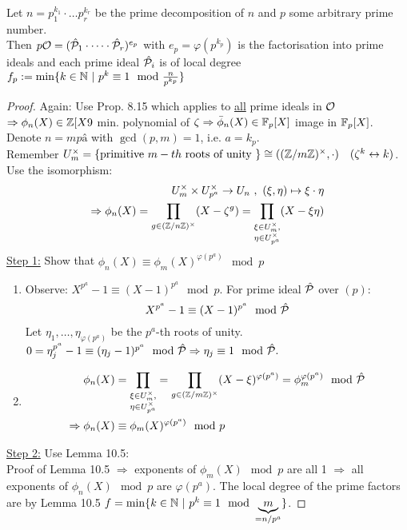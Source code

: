 \begin{Prop}
Let $n=p_1^{k_1} \cdot \ldots p_r^{k_r}$ be the prime decomposition of $n$ and $p$ some arbitrary prime number.\\
Then $p \mathcal{O}=(\hat{\mathcal{P}}_1 \cdot \dots \cdot \hat{\mathcal{P}}_r)^{e_p}$ with $e_p=\varphi(p^{k_p})$ is the factorisation into prime ideals and each prime ideal $\hat{\mathcal{P}}_i$ is of local degree $f_p:=\min\{k \in \mathbb{N} \ | \ p^k \equiv 1 \mod \frac{n}{p^{k_p}}\}$
\end{Prop}

\begin{proof}
Again: Use Prop. 8.15 which applies to \underline{all} prime ideals in $\mathcal{O}$\\
$\Rightarrow \phi_n(X) \in \mathbb{Z}[X9$ min. polynomial of $\zeta \Rightarrow \bar{\phi}_n(X) \in \mathbb{F}_p[X]$ image in $\mathbb{F}_p[X]$.\\
Denote $n=mpâ$ with $\gcd(p,m)=1$, i.e. $a=k_p$.\\
Remember $U_m^\times=\{\text{primitive } m-th \text{ roots of unity }\} \cong ((\mathbb{Z}/m\mathbb{Z})^\times, \cdot) \quad (\zeta^k\leftrightarrow k)$.\\
Use the isomorphism:
\begin{align*}
U_m^\times \times U_{p^a}^\times \to U_n \ , \ (\xi, \eta) \mapsto \xi \cdot \eta\\
\Rightarrow \phi_n(X)=\prod_{g \in (\mathbb{Z}/n\mathbb{Z})^\times} (X -\zeta^g) = \prod_{\substack{\xi \in U_m^\times,\\ \eta \in U_{p^a}^\times}} (X -\xi \eta)
\end{align*}
\underline{Step 1:} Show that $\phi_n(X) \equiv \phi_m(X)^{\varphi(p^a)} \mod p$
\begin{enumerate}[(1)]
\item Observe: $X^{p^a}-1 \equiv (X-1)^{p^a} \mod p$. For prime ideal $\hat{\mathcal{P}}$ over $(p)$:
\[X^{p^a}-1 \equiv (X-1)^{p^a} \mod {\hat{\mathcal{P}}}\]
Let $\eta_1, \dots, \eta_{\varphi(p^a)}$ be the $p^a$-th roots of unity.\\
$0=\eta_j^{p^a}-1 \equiv (\eta_j-1)^{p^a}\mod {\hat{\mathcal{P}}} \Rightarrow \eta_j \equiv 1 \mod {\hat{\mathcal{P}}}.$
\item \begin{align*}
\phi_n(X)&=\prod_{\substack{\xi \in U_m^\times,\\ \eta \in U_{p^a}^\times}}=\prod_{g \in (\mathbb{Z}/m\mathbb{Z})^\times} (X -\xi)^{\varphi(p^a)} = \phi_m^{\varphi(p^a)} \mod {\hat{\mathcal{P}}}\\
\Rightarrow \phi_n(X) &\equiv \phi_m(X)^{\varphi(p^a)} \mod p
\end{align*}
\end{enumerate}
\underline{Step 2:} Use Lemma 10.5:\\
Proof of Lemma 10.5 $\Rightarrow$ exponents of $\phi_m(X) \mod p$ are all 1 $\Rightarrow$ all exponents of $\phi_n(X) \mod p$ are $\varphi(p^a)$. The local degree of the prime factors are by Lemma 10.5 \linebreak $f=\min\{k \in \mathbb{N} \ | \ p^k \equiv 1 \mod \underbrace{m}_{=n/p^a}\}$.
\end{proof}

